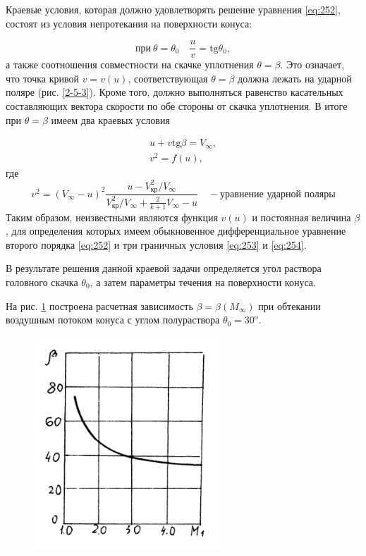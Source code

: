 \documentclass[specialist, subf, href, colorlinks=true, 14pt, final]{disser}
\theoremstyle{definition}
\begin{document}
Краевые условия, которая должно удовлетворять решение уравнения \eqref{eq:252}, состоят из условия непротекания на поверхности конуса:
\addtocounter{equation}{1}
\begin{equation}\label{eq:253}
  \text{при}\ \theta = \theta_0 \quad \frac{u}{v} = \text{tg}\theta_0, 
  \tag{3}
\end{equation}
а также соотношения совместности на скачке уплотнения $\theta = \beta$. Это означает, что точка кривой $v = v(u)$, соответствующая $\theta = \beta$ должна лежать на ударной поляре (рис. \ref{2-5-3}). Кроме того, должно выполняться равенство касательных составляющих вектора скорости по обе стороны от скачка уплотнения. В итоге при $\theta = \beta$ имеем два краевых условия
\addtocounter{equation}{1}
\begin{equation}\label{eq:254}
   \begin{array}{l}
   u + v \text{tg}\beta = V_{\infty}, \\
   v^2 = f(u),
   \end{array}
  \tag{4}
\end{equation} 
где 
\[
v^2 = (V_{\infty} - u)^2 \frac{u - V^2_{\text{кр}}/V_{\infty}}{V^2_{\text{кр}}/V_{\infty} + \frac{2}{k +1}V_{\infty} - u }  \quad - \text{уравнение ударной поляры}
\]
Таким образом, неизвестными являются функция $v(u)$ и постоянная величина $\beta$, для определения которых имеем обыкновенное дифференциальное уравнение второго порядка \eqref{eq:252} и три граничных условия \eqref{eq:253} и \eqref{eq:254}.

В результате решения данной краевой задачи определяется угол раствора головного скачка $\theta_0$, а затем параметры течения на поверхности конуса.

На рис. \ref{2-5-4} построена расчетная зависимость $\beta = \beta(M_{\infty})$ при обтекании воздушным потоком конуса с углом полураствора $\theta_{0} = 30^{\text{o}}$.
\begin{figure} 
  \includegraphics[width=70mm]{pics/2-5-4.png}
  \caption{}
  \label{2-5-4}
\end{figure}
\end{document}
